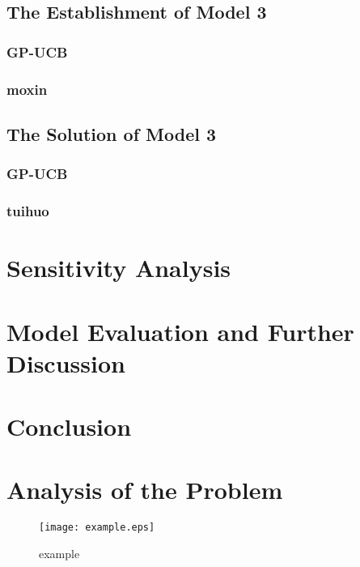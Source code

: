 \documentclass{mcmthesis}  %
\begin{document}
\subsection{The Establishment of Model 3}
\subsubsection{GP-UCB}
\subsubsection{moxin}
\subsection{The Solution of Model 3}
\subsubsection{GP-UCB}
\subsubsection{tuihuo}












\section{Sensitivity Analysis}  %

\section{Model Evaluation and Further Discussion}  %

\section{Conclusion}  %


\section{Analysis of the Problem}  %

\begin{figure}[h]  %
\small
\centering  %
\texttt{[image: example.eps]}  %
\caption{example} \label{fig:example}  %
\end{figure}  %
\end{document}
